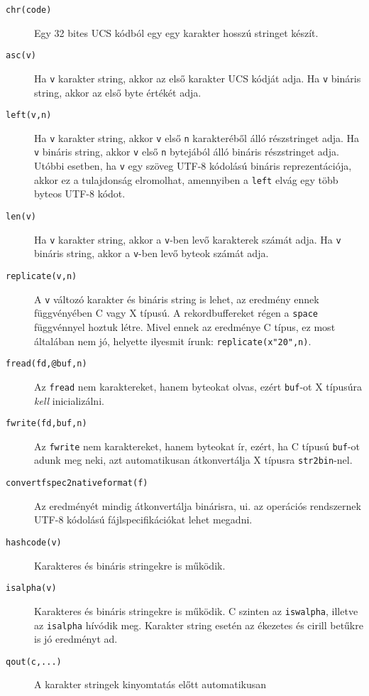 \begin{description}
\item[{\tt chr(code)}]
    Egy 32 bites UCS kódból egy egy karakter hosszú stringet készít.
\item[{\tt asc(v)}]
    Ha \verb!v! karakter string, akkor az első karakter UCS kódját adja.
    Ha \verb!v! bináris string, akkor az első byte értékét adja.
\item[{\tt left(v,n)}]
    Ha \verb!v! karakter string, akkor \verb!v! első \verb!n!
    karakteréből álló részstringet adja.
    Ha \verb!v! bináris string, akkor \verb!v! első \verb!n!
    bytejából álló bináris részstringet adja.
    Utóbbi esetben, ha \verb!v! egy szöveg UTF-8 kódolású bináris 
    reprezentációja, akkor ez a tulajdonság elromolhat, amennyiben 
    a \verb!left! elvág egy több byteos UTF-8 kódot.
\item[{\tt len(v)}]
    Ha \verb!v! karakter string, akkor a \verb!v!-ben levő karakterek
    számát adja.
    Ha \verb!v! bináris string, akkor a \verb!v!-ben levő byteok
    számát adja. 
\item[{\tt replicate(v,n)}]
    A \verb!v! változó karakter és bináris string is lehet,
    az eredmény ennek függvényében C vagy X típusú. A rekordbuffereket
    régen a \verb!space! függvénnyel hoztuk létre. Mivel ennek
    az eredménye C típus, ez most általában nem jó, helyette
    ilyesmit írunk: \verb!replicate(x"20",n)!.
\item[{\tt fread(fd,@buf,n)}]
    Az \verb!fread! nem karaktereket, hanem byteokat olvas,
    ezért \verb!buf!-ot X típusúra {\it kell\/} inicializálni.
\item[{\tt fwrite(fd,buf,n)}]
    Az \verb!fwrite! nem karaktereket, hanem byteokat ír,
    ezért, ha C típusú \verb!buf!-ot adunk meg neki, azt automatikusan
    átkonvertálja X típusra \verb!str2bin!-nel.
\item[{\tt convertfspec2nativeformat(f)}]
    Az eredményét mindig átkonvertálja binárisra, ui.
    az operációs rendszernek UTF-8 kódolású fájlspecifikációkat
    lehet megadni.
\item[{\tt hashcode(v)}]
    Karakteres és bináris stringekre is működik.
\item[{\tt isalpha(v)}]
    Karakteres és bináris stringekre is működik.
    C szinten az \verb!iswalpha!, illetve az \verb!isalpha!
    hívódik meg. Karakter string esetén az ékezetes és cirill 
    betűkre is jó eredményt ad.
\item[{\tt qout(c,...)}]
    A karakter stringek kinyomtatás előtt automatikusan

\end{description}
